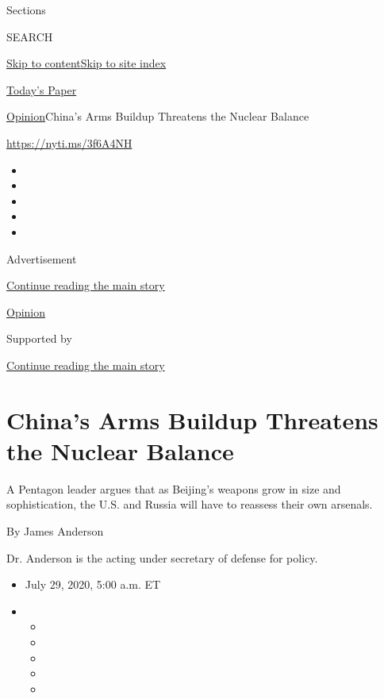 Sections

SEARCH

\protect\hyperlink{site-content}{Skip to
content}\protect\hyperlink{site-index}{Skip to site index}

\href{https://myaccount.nytimes3xbfgragh.onion/auth/login?response_type=cookie\&client_id=vi}{}

\href{https://www.nytimes3xbfgragh.onion/section/todayspaper}{Today's
Paper}

\href{/section/opinion}{Opinion}\textbar{}China's Arms Buildup Threatens
the Nuclear Balance

\url{https://nyti.ms/3f6A4NH}

\begin{itemize}
\item
\item
\item
\item
\item
\end{itemize}

Advertisement

\protect\hyperlink{after-top}{Continue reading the main story}

\href{/section/opinion}{Opinion}

Supported by

\protect\hyperlink{after-sponsor}{Continue reading the main story}

\hypertarget{chinas-arms-buildup-threatens-the-nuclear-balance}{%
\section{China's Arms Buildup Threatens the Nuclear
Balance}\label{chinas-arms-buildup-threatens-the-nuclear-balance}}

A Pentagon leader argues that as Beijing's weapons grow in size and
sophistication, the U.S. and Russia will have to reassess their own
arsenals.

By James Anderson

Dr. Anderson is the acting under secretary of defense for policy.

\begin{itemize}
\item
  July 29, 2020, 5:00 a.m. ET
\item
  \begin{itemize}
  \item
  \item
  \item
  \item
  \item
  \end{itemize}
\end{itemize}

